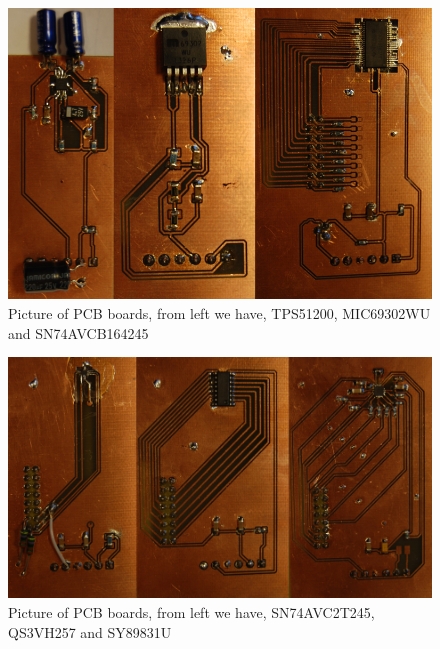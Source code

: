\documentclass[12pt]{article}
\numberwithin{figure}{section}
\begin{document}
\begin{figure}[!htbp]
  \centering
  \includegraphics[width=\textwidth]{PCB_board1.png}
  \caption{Picture of PCB boards, from left we have, TPS51200, MIC69302WU and SN74AVCB164245}
  \label{PCB_board1}
\end{figure}

\begin{figure}[!htbp]
  \centering
  \includegraphics[width=\textwidth]{PCB_board2.png}
  \caption{Picture of PCB boards, from left we have, SN74AVC2T245, QS3VH257 and SY89831U}
  \label{PCB_board2}
\end{figure}
\end{document}
